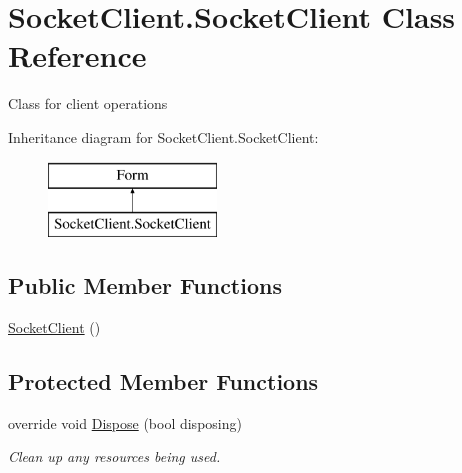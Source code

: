 \hypertarget{class_socket_client_1_1_socket_client}{}\section{Socket\+Client.\+Socket\+Client Class Reference}
\label{class_socket_client_1_1_socket_client}


Class for client operations  


Inheritance diagram for Socket\+Client.\+Socket\+Client\+:\begin{figure}[H]
\begin{center}
\leavevmode
\includegraphics[height=2.000000cm]{class_socket_client_1_1_socket_client}
\end{center}
\end{figure}
\subsection*{Public Member Functions}
\begin{DoxyCompactItemize}
\item 
\hyperlink{class_socket_client_1_1_socket_client_aa6b5f080048da540d30bfe849b1e3260}{Socket\+Client} ()
\end{DoxyCompactItemize}
\subsection*{Protected Member Functions}
\begin{DoxyCompactItemize}
\item 
override void \hyperlink{class_socket_client_1_1_socket_client_ab28be4e020b665a2b8cc879beac14062}{Dispose} (bool disposing)
\begin{DoxyCompactList}\small\item\em Clean up any resources being used. \end{DoxyCompactList}\end{DoxyCompactItemize}
